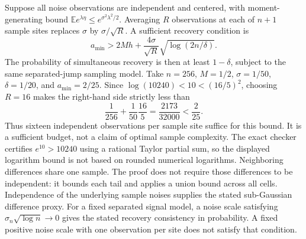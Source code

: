 Suppose all noise observations are independent and centered, with moment-generating bound $\mathbb E e^{\lambda\eta}\le e^{\sigma^2\lambda^2/2}$. Averaging $R$ observations at each of $n+1$ sample sites replaces $\sigma$ by $\sigma/\sqrt R$. A sufficient recovery condition is
\[
a_{\min}>2Mh+\frac{4\sigma}{\sqrt R}\sqrt{\log(2n/\delta)}.
\]
The probability of simultaneous recovery is then at least $1-\delta$, subject to the same separated-jump sampling model.
Take $n=256$, $M=1/2$, $\sigma=1/50$, $\delta=1/20$, and $a_{\min}=2/25$. Since $\log(10240)<10<(16/5)^2$, choosing $R=16$ makes the right-hand side strictly less than
\[
\frac1{256}+\frac1{50}\frac{16}{5}
=\frac{2173}{32000}<\frac2{25}.
\]
Thus sixteen independent observations per sample site suffice for this bound. It is a sufficient budget, not a claim of optimal sample complexity. The exact checker certifies $e^{10}>10240$ using a rational Taylor partial sum, so the displayed logarithm bound is not based on rounded numerical logarithms.
Neighboring differences share one sample. The proof does not require those differences to be independent: it bounds each tail and applies a union bound across all cells. Independence of the underlying sample noises supplies the stated sub-Gaussian difference proxy.
For a fixed separated signal model, a noise scale satisfying $\sigma_n\sqrt{\log n}\to0$ gives the stated recovery consistency in probability. A fixed positive noise scale with one observation per site does not satisfy that condition.

